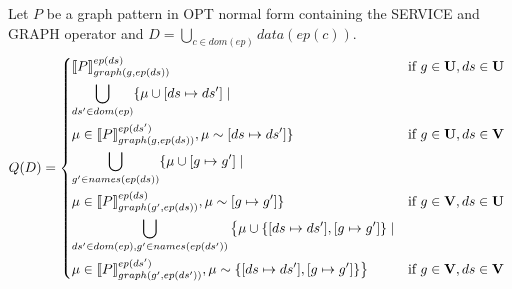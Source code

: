 \begin{lemma}\label{smalllemma}
	Let $P$ be a graph pattern in OPT normal form containing the SERVICE and GRAPH operator
	and $D = \bigcup\limits_{c \in dom(ep)} data(ep(c))$.
	\begin{align*}
		Q(D) = \begin{dcases*}
			\ll P \rr^{ep(ds)}_{graph(g,ep(ds))} 
			& if $g \in \U,ds \in \U$\\
			\bigcup\limits_{ds' \in dom(ep)} \{ \mu \cup [ds \mapsto ds'] \mid\\ \mu \in
			\ll P\rr^{ep(ds')}_{graph(g,ep(ds))}, \mu \sim 	[ds\mapsto ds'] \} 
			&if $g \in \U,ds \in \V$\\
			\bigcup\limits_{g' \in names(ep(ds))}\{ \mu \cup [g \mapsto g']
				\mid\\ \mu \in
			\ll P\rr ^{ep(ds)}_{graph(g',ep(ds))} , \mu \sim [g\mapsto g'] \} 
			& if $g \in \V,ds \in \U$ \\
			\bigcup\limits_{ds' \in dom(ep), g' \in names(ep(ds'))} \big\{ \mu \cup
				\{[ds\mapsto ds'],[g \mapsto g']\} \mid\\ \mu \in
				\ll P\rr^{ep(ds')}_{graph(g',ep(ds'))}, 
				\mu \sim
			\{[ds\mapsto ds'], [g \mapsto g']\}\big\} 
			& if $g \in \V,ds \in \V$\\
		\end{dcases*}
	\end{align*}

%
\end{lemma}


